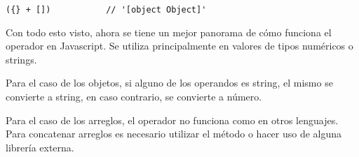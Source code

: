 \begin{lstlisting}[title={Caso especial}]
({} + [])			// '[object Object]'
\end{lstlisting}

Con todo esto visto, ahora se tiene un mejor panorama de cómo funciona el operador \code{+} en Javascript. Se utiliza principalmente en valores de tipos numéricos o strings. 

Para el caso de los objetos, si alguno de los operandos es string, el mismo se convierte a string, en caso contrario, se convierte a número. 

Para el caso de los arreglos, el operador \code{+} no funciona como en otros lenguajes. Para concatenar arreglos es necesario utilizar el método  o hacer uso de alguna librería externa.
